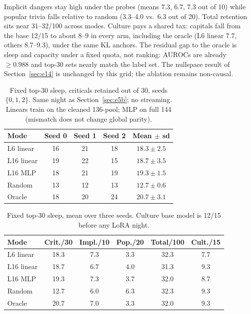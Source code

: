\documentclass[11pt,a4paper]{article}
\begin{document}
Implicit dangers stay high under the probes (means 7.3, 6.7, 7.3 out of 10) while popular trivia falls relative to random (3.3--4.0 vs.\ 6.3 out of 20).
Total retention sits near 31--32/100 across modes.
Culture pays a shared tax: capitals fall from the base 12/15 to about 8--9 in every arm, including the oracle (L6 linear 7.7, others 8.7--9.3), under the same KL anchors.
The residual gap to the oracle is sleep and capacity under a fixed quota, not ranking: AUROCs are already $\geq 0.988$ and top-30 sets nearly match the label set.
The nullspace result of Section~\ref{sec:e14} is unchanged by this grid; the ablation remains non-causal.

\begin{table}[t]
\centering
\caption{Fixed top-30 sleep, criticals retained out of 30, seeds $\{0,1,2\}$. Same night as Section~\ref{sec:e5b}; no streaming. Linears train on the cleaned 136-pool; MLP on full 144 (mismatch does not change global parity).}
\label{tab:e15}
\small
\begin{tabular}{lcccc}
\toprule
Mode & Seed 0 & Seed 1 & Seed 2 & Mean $\pm$ sd \\
\midrule
L6 linear & 16 & 21 & 18 & $18.3{\pm}2.5$ \\
L16 linear & 19 & 22 & 15 & $18.7{\pm}3.5$ \\
L16 MLP & 18 & 21 & 19 & $19.3{\pm}1.5$ \\
Random & 13 & 12 & 13 & $12.7{\pm}0.6$ \\
Oracle & 18 & 20 & 24 & $20.7{\pm}3.1$ \\
\bottomrule
\end{tabular}
\end{table}

\begin{table}[t]
\centering
\caption{Fixed top-30 sleep, mean over three seeds. Culture base model is 12/15 before any LoRA night.}
\label{tab:e15b}
\small
\begin{tabular}{lccccc}
\toprule
Mode & Crit./30 & Impl./10 & Pop./20 & Total/100 & Cult./15 \\
\midrule
L6 linear & 18.3 & 7.3 & 3.3 & 32.3 & 7.7 \\
L16 linear & 18.7 & 6.7 & 4.0 & 31.3 & 9.3 \\
L16 MLP & 19.3 & 7.3 & 3.7 & 32.0 & 8.7 \\
Random & 12.7 & 6.0 & 6.3 & 32.3 & 9.3 \\
Oracle & 20.7 & 7.0 & 3.3 & 32.0 & 9.3 \\
\bottomrule
\end{tabular}
\end{table}
\end{document}
